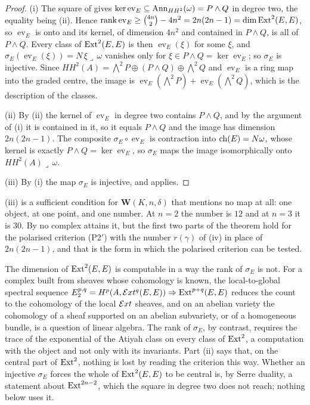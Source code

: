 \begin{proof}
(i) The square of  gives $\ker\operatorname{ev}_{E}
\subseteq\operatorname{Ann}_{HH^{2}}(\omega)=P\wedge Q$ in degree two, the equality being
(ii). Hence $\operatorname{rank}\operatorname{ev}_{E}
\ge\binom{4n}{2}-4n^{2}=2n(2n-1)=\dim\operatorname{Ext}^{2}(E,E)$, so
$\operatorname{ev}_{E}$ is onto and its kernel, of dimension $4n^{2}$ and
contained in $P\wedge Q$, is all of $P\wedge Q$. Every class of
$\operatorname{Ext}^{2}(E,E)$ is then $\operatorname{ev}_{E}(\xi)$ for some $\xi$, and
$\sigma_{E}(\operatorname{ev}_{E}(\xi))=N\,\xi\lrcorner\,\omega$ vanishes only
for $\xi\in P\wedge Q=\ker\operatorname{ev}_{E}$; so $\sigma_{E}$ is injective.
Since $HH^{2}(A)=\bigwedge^{2}P\oplus(P\wedge Q)\oplus\bigwedge^{2}Q$ and
$\operatorname{ev}_{E}$ is a ring map into the graded centre, the image is
$\operatorname{ev}_{E}(\bigwedge^{2}P)+\operatorname{ev}_{E}(\bigwedge^{2}Q)$,
which is the description of the classes.

(ii) By (ii) the kernel of $\operatorname{ev}_{E}$ in
degree two contains $P\wedge Q$, and by the argument of (i) it is contained in
it, so it equals $P\wedge Q$ and the image has dimension $2n(2n-1)$. The
composite $\sigma_{E}\circ\operatorname{ev}_{E}$ is contraction into
$\operatorname{ch}(E)=N\omega$, whose kernel is exactly $P\wedge Q=\ker\operatorname{ev}_{E}$,
so $\sigma_{E}$ maps the image isomorphically onto
$HH^{2}(A)\lrcorner\,\omega$.

(iii) By (i) the map $\sigma_{E}$ is injective, and 
applies.
\end{proof}

(iii) is a sufficient condition for
$\mathbf{W}(K,n,\delta)$ that mentions no map at all: one object, at one
point, and one number. At $n=2$ the number is $12$ and at $n=3$ it is $30$.
By  no complex attains it, but the first two parts of the
theorem hold for the polarised criterion (P2$'$) with the number $r(\gamma)$
of (iv) in place of $2n(2n-1)$, and that is the form
in which the polarised criterion can be tested.

The dimension of $\operatorname{Ext}^{2}(E,E)$ is computable in a way the rank of
$\sigma_{E}$ is not. For a complex built from sheaves whose cohomology is
known, the local-to-global spectral sequence
$E_{2}^{p,q}=H^{p}(A,\mathcal{E} xt^{q}(E,E))\Rightarrow\operatorname{Ext}^{p+q}(E,E)$ reduces the
count to the cohomology of the local $\mathcal{E} xt$ sheaves, and on an abelian
variety the cohomology of a sheaf supported on an abelian subvariety, or of a
homogeneous bundle, is a question of linear algebra. The rank of
$\sigma_{E}$, by contrast, requires the trace of the exponential of the
Atiyah class on every class of $\operatorname{Ext}^{2}$, a computation with the object and
not only with its invariants. Part (ii) says that, on the central part of
$\operatorname{Ext}^{2}$, nothing is lost by reading the criterion this way. Whether an
injective $\sigma_{E}$ forces the whole of $\operatorname{Ext}^{2}(E,E)$ to be central is,
by Serre duality, a statement about $\operatorname{Ext}^{2n-2}$, which the square in degree
two does not reach; nothing below uses it.

